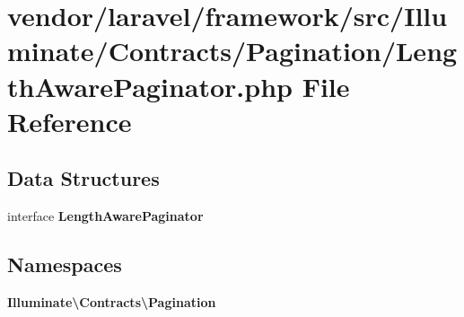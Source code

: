 \section{vendor/laravel/framework/src/\+Illuminate/\+Contracts/\+Pagination/\+Length\+Aware\+Paginator.php File Reference}
\label{_contracts_2_pagination_2_length_aware_paginator_8php}
\subsection*{Data Structures}
\begin{DoxyCompactItemize}
\item 
interface {\bf Length\+Aware\+Paginator}
\end{DoxyCompactItemize}
\subsection*{Namespaces}
\begin{DoxyCompactItemize}
\item 
 {\bf Illuminate\textbackslash{}\+Contracts\textbackslash{}\+Pagination}
\end{DoxyCompactItemize}
